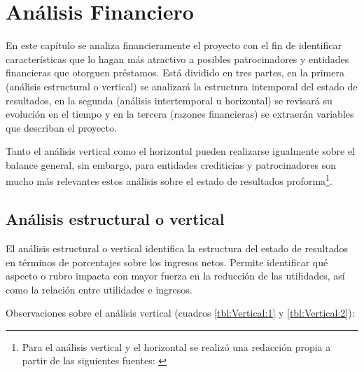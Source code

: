 \chapter{Análisis Financiero}

En este capítulo se analiza financieramente el proyecto con el fin de identificar características que lo hagan más atractivo a posibles patrocinadores y entidades financieras que otorguen préstamos. Está dividido en tres partes, en la primera (análisis estructural o vertical) se analizará la estructura intemporal del estado de resultados, en la segunda (análisis intertemporal u horizontal) se revisará su evolución en el tiempo y en la tercera (razones financieras) se extraerán variables que describan el proyecto.

Tanto el análisis vertical como el horizontal pueden realizarse igualmente sobre el balance general, sin embargo, para entidades crediticias y patrocinadores son mucho más relevantes estos análisis sobre el estado de resultados proforma\footnote{Para el análisis vertical y el horizontal se realizó una redacción propia a partir de las siguientes fuentes: \citep{brock1987contabilidad, mejia2006diccionario, dobarganes2005contabilidad}}.

\section{Análisis estructural o vertical}
\label{sec:AnalisisVertical}

El análisis estructural o vertical identifica la estructura del estado de resultados en términos de porcentajes sobre los ingresos netos. Permite identificar qué aspecto o rubro impacta con mayor fuerza en la reducción de las utilidades, así como la relación entre utilidades e ingresos.

Observaciones sobre el análisis vertical (cuadros \ref{tbl:Vertical:1} y \ref{tbl:Vertical:2}):

